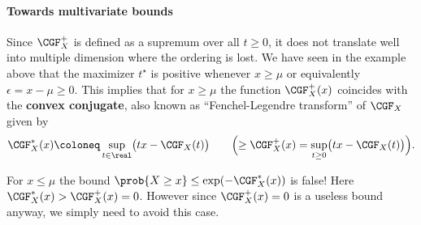 \paragraph*{Towards multivariate bounds}
Since \(\CGF_X^+\) is defined as a supremum over all \(t\ge 0\), it does not
translate well into multiple dimension where the ordering is lost.
We have seen in the example above that the maximizer \(t^\star\) is positive
whenever \(x\ge \mu\) or equivalently \(\epsilon = x - \mu \ge 0\).
This implies that for \(x\ge \mu\) the function \(\CGF_X^+(x)\) coincides
with the \textbf{convex conjugate}, also known as ``Fenchel-Legendre transform''
of \(\CGF_X\) given by
\[
    \CGF_X^*(x) \coloneq \sup_{t\in \real} \bigl(t x - \CGF_X(t)\bigr)
    \qquad \Bigl(\ge \CGF_X^+(x)= \sup_{t \ge 0} \bigl(t x - \CGF_X(t)\bigr)\Bigr).
\]
\begin{warning}
    \label{warn: difference between CGF star and plus}
    For \(x\le \mu\) the bound \(\prob{X \ge x} \le \exp(-\CGF_X^*(x))\) is
    false! Here \(\CGF_X^*(x) > \CGF_X^+(x) = 0\).  However since
   \(\CGF_X^+(x)=0\) is a useless bound anyway, we simply need to avoid this
    case.
\end{warning}




